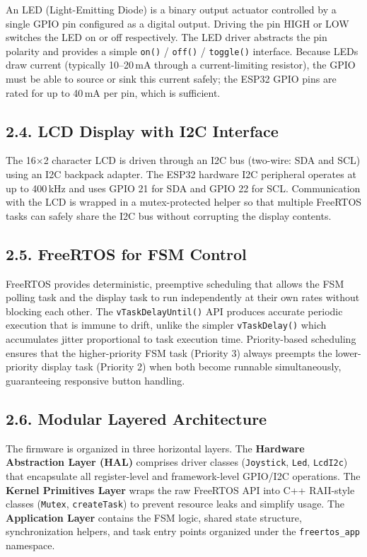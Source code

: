 \documentclass[12pt]{article}
\begin{document}
An LED (Light-Emitting Diode) is a binary output actuator controlled by a single GPIO pin configured as a digital output. Driving the pin HIGH or LOW switches the LED on or off respectively. The LED driver abstracts the pin polarity and provides a simple \texttt{on()} / \texttt{off()} / \texttt{toggle()} interface. Because LEDs draw current (typically 10–20\,mA through a current-limiting resistor), the GPIO must be able to source or sink this current safely; the ESP32 GPIO pins are rated for up to 40\,mA per pin, which is sufficient.

\subsection*{2.4. LCD Display with I2C Interface}

The 16×2 character LCD is driven through an I2C bus (two-wire: SDA and SCL) using an I2C backpack adapter. The ESP32 hardware I2C peripheral operates at up to 400\,kHz and uses GPIO 21 for SDA and GPIO 22 for SCL. Communication with the LCD is wrapped in a mutex-protected helper so that multiple FreeRTOS tasks can safely share the I2C bus without corrupting the display contents.

\subsection*{2.5. FreeRTOS for FSM Control}

FreeRTOS provides deterministic, preemptive scheduling that allows the FSM polling task and the display task to run independently at their own rates without blocking each other. The \texttt{vTaskDelayUntil()} API produces accurate periodic execution that is immune to drift, unlike the simpler \texttt{vTaskDelay()} which accumulates jitter proportional to task execution time. Priority-based scheduling ensures that the higher-priority FSM task (Priority 3) always preempts the lower-priority display task (Priority 2) when both become runnable simultaneously, guaranteeing responsive button handling.

\subsection*{2.6. Modular Layered Architecture}

The firmware is organized in three horizontal layers. The \textbf{Hardware Abstraction Layer (HAL)} comprises driver classes (\texttt{Joystick}, \texttt{Led}, \texttt{LcdI2c}) that encapsulate all register-level and framework-level GPIO/I2C operations. The \textbf{Kernel Primitives Layer} wraps the raw FreeRTOS API into C++ RAII-style classes (\texttt{Mutex}, \texttt{createTask}) to prevent resource leaks and simplify usage. The \textbf{Application Layer} contains the FSM logic, shared state structure, synchronization helpers, and task entry points organized under the \texttt{freertos\_app} namespace.
\end{document}
